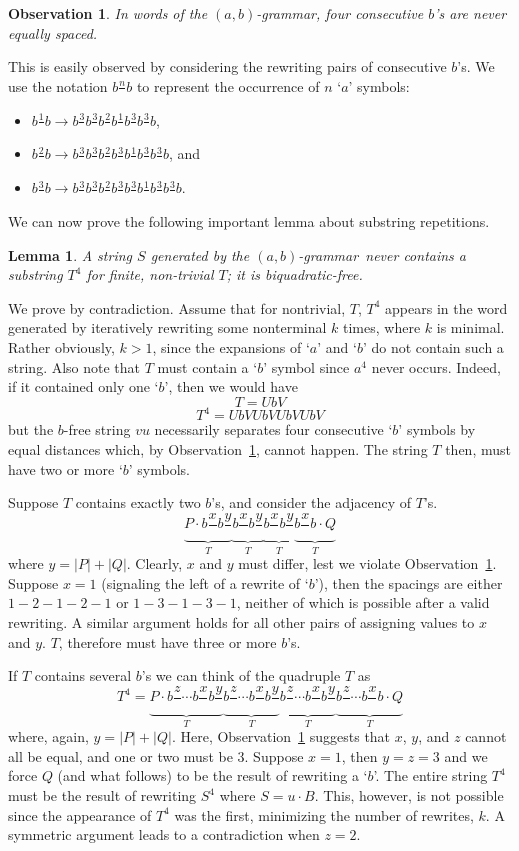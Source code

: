 \documentclass[11pt]{article}
\def\emph#1{{\em #1\/}}
\def\term#1{\emph{#1}}
\newcounter{thm}
\newtheorem{lemma}[thm]{Lemma}
\newtheorem{observation}[thm]{Observation}
\def\ni{\noindent}
\def\s#1{\frac{#1}{}}
\def\ab{$(a,b)$}
\def\abg{\ab-grammar}
\def\q#1{`$#1$'}
\def\Proof{\ni{\bf Proof:} }
\begin{document}
\begin{observation}\label{obs:fourb}
In words of the \abg, four consecutive $b$'s are never equally spaced.
\end{observation}
\ni This is easily observed by considering the rewriting pairs of consecutive $b$'s. We
use the notation $b\s{n}b$ to represent the occurrence of $n$ \q{a} symbols:
\begin{itemize}
\item $b\s{1}b\rightarrow b\s{3}b\s{3}b\s{2}b\s{1}b\s{3}b\s{3}b$,
\item $b\s{2}b\rightarrow b\s{3}b\s{3}b\s{2}b\s{3}b\s{1}b\s{3}b\s{3}b$, and
\item $b\s{3}b\rightarrow b\s{3}b\s{3}b\s{2}b\s{3}b\s{3}b\s{1}b\s{3}b\s{3}b$.
\end{itemize}

\ni We can now prove the following important lemma about substring repetitions.
\begin{lemma}\label{lemma:p4}
A string $S$ generated by the \abg\ never contains a substring $T^4$ for
finite, non-trivial $T$; it is \term{biquadratic-free}.
\end{lemma}
\Proof We prove by contradiction.  Assume that for nontrivial, $T$, $T^4$ appears
in the word generated by iteratively rewriting some nonterminal $k$ times, where $k$ is minimal.
Rather obviously, $k>1$, since the expansions of \q{a} and \q{b} do not contain
such a string.  Also note that $T$ must contain a \q{b} symbol since $a^4$ never
occurs.  Indeed, if it contained only one \q{b}, then we would have
 $$T=UbV$$
 $$T^4=UbVUbVUbVUbV$$
\ni but the $b$-free string $vu$ necessarily separates four consecutive \q{b} symbols
by equal distances which, by Observation~\ref{obs:fourb}, cannot happen.  The string $T$ then, must have
two or more \q{b} symbols.

Suppose $T$ contains exactly two $b$'s, and consider the adjacency of $T$'s.
$$\underbrace{P\cdot b\s{x}b\s{y} }_T\underbrace{b\s{x}b\s{y} }_T\underbrace{b\s{x}b\s{y} }_T\underbrace{b\s{x}b\cdot Q}_T$$
\ni where $y=|P|+|Q|$.  Clearly, $x$ and $y$ must differ, lest we violate Observation~\ref{obs:fourb}.  
Suppose $x=1$ (signaling the left of a rewrite of \q{b}), then the spacings are either $1-2-1-2-1$ or
$1-3-1-3-1$, neither of which is possible after a valid rewriting.  A similar argument holds for all other
pairs of assigning values to $x$ and $y$.  $T$, therefore must have three or more $b$'s.

If $T$ contains several $b$'s we can think of the quadruple $T$ as
$$T^4=\underbrace{P\cdot b\s{z}\cdots b\s{x}b\s{y} }_T\underbrace{b\s{z}\cdots
  b\s{x}b\s{y} }_T\underbrace{b\s{z}\cdots b\s{x}b\s{y}
}_T\underbrace{b\s{z}\cdots b\s{x}b\cdot Q}_T$$ \ni where, again, $y=|P|+|Q|$.
Here, Observation~\ref{obs:fourb} suggests that $x$, $y$, and $z$ cannot all
be equal, and one or two must be $3$.  Suppose $x=1$, then $y=z=3$ and we
force $Q$ (and what follows) to be the result of rewriting a \q{b}.  The entire
string $T^4$ must be the result of rewriting $S^4$ where $S=u\cdot B$.  This,
however, is not possible since the appearance of $T^4$ was the first,
minimizing the number of rewrites, $k$.  A symmetric argument leads to a
contradiction when $z=2$.
\end{document}
